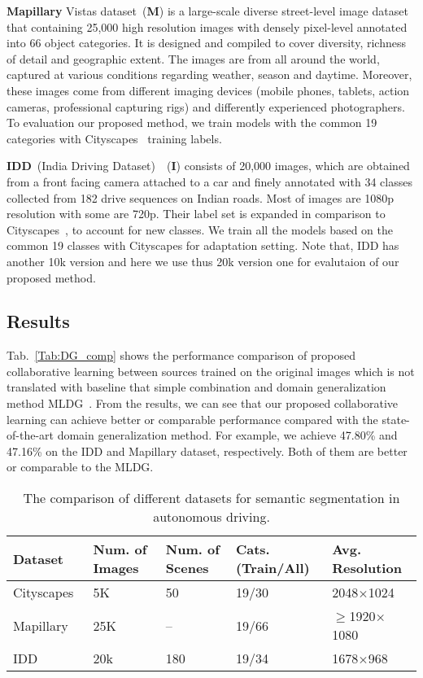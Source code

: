 \documentclass[final]{cvpr}
\begin{document}
\textbf{Mapillary} Vistas dataset~(\textbf{M}) is a large-scale diverse street-level image dataset that containing 25,000 high resolution images with densely pixel-level annotated into 66 object categories. It is designed and compiled to cover diversity, richness of detail and geographic extent. The images are from all around the world, captured at various conditions regarding weather, season and daytime. Moreover, these images come from different imaging devices (mobile phones, tablets, action cameras, professional capturing rigs) and differently experienced photographers. To evaluation our proposed method, we train models with the common 19 categories with Cityscapes~\cite{cordts2016cityscapes} training labels.

\textbf{IDD}~(India Driving Dataset)~\cite{varma2019idd}~(\textbf{I}) consists of 20,000 images, which are obtained from a front facing camera attached to a car and finely annotated with 34 classes collected from 182 drive sequences on Indian roads. Most of images are 1080p resolution with some are 720p. Their label set is expanded in comparison to Cityscapes~\cite{cordts2016cityscapes}, to account for new classes. We train all the models based on the common 19 classes with Cityscapes for adaptation setting. Note that, IDD has another 10k version and here we use thus 20k version one for evalutaion of our proposed method.



\subsection{Results}
Tab.~\ref{Tab:DG_comp} shows the performance comparison of proposed collaborative learning between sources trained on the original images which is not translated with baseline that simple combination and domain generalization method MLDG~\cite{zhang2020generalizable}. From the results, we can see that our proposed collaborative learning can achieve better or comparable performance compared with the state-of-the-art domain generalization method. For example, we achieve 47.80\% and 47.16\% on the IDD and Mapillary dataset, respectively. Both of them are better or comparable to the MLDG.
\begin{table}[t]
	\setlength{\tabcolsep}{0.66mm}
	\caption{The comparison of different datasets for semantic segmentation in autonomous driving.}
	\label{tab:data_comp}
	\begin{tabular}{l|p{1.2cm}<{\centering}p{1.32cm}<{\centering}p{1.4cm}<{\centering}p{1.9cm}<{\centering}}
		\hline
		Dataset & Num. of Images & Num. of Scenes & Cats. (Train/All) & Avg. Resolution \\
		\hline
		Cityscapes~\cite{cordts2016cityscapes} & 5K & 50 & 19/30 & 2048$\times$1024\\
		Mapillary~\cite{MVD2017} & 25K & -- & 19/66 & $\ge$1920$\times$1080\\
		IDD~\cite{varma2019idd} & 20k & 180 & 19/34 & 1678$\times$968\\
		\hline
	\end{tabular}
\end{table}
\end{document}
